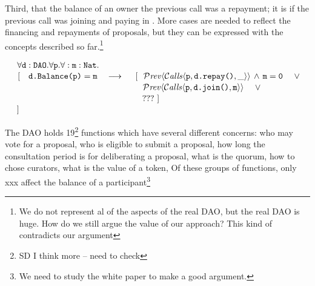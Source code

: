 \noindent
Third, that the balance of an owner  the previous call was
a repayment; it is  if  the previous call was  joining  and paying in . More cases are needed to reflect the financing and repayments of proposals, but they can be expressed with the concepts described so far.\footnote{We do not represent al of the
aspects of the real DAO, but the real DAO is huge.
How do we still argue the value of our approach? This kind of contradicts our argument}

\noindent
$\strut \hspace{0.5cm} \forall {\mbox{\tt{d}}}:{\mbox{\tt{DAO}}}.\forall {\mbox{\tt{p}}}.\forall:{\mbox{\tt{m}}}:{\mbox{\tt{Nat}}}.$\\
$\strut \hspace{0.5cm} [ \ \ \  \prg{d.Balance(p)}=\prg{m} \ \ \  \longrightarrow   
 \ \  \ \ 
  [ \  \ \Prev{\Calls{\prg{p},\prg{d.repay()},\_}}\, \wedge\, \prg{m}=\prg{0} \ \ \ \ \vee $\\
$\strut \hspace{5.7cm}      
\Prev{\Calls{\prg{p},\prg{d.join()},\prg{m}}}  \ \ \ \ \vee   $\\
 $\strut \hspace{5.7cm}  ??? \  ]$ \\
%                         
$\strut \hspace{0.5cm} ] $
  



 

\noindent

The DAO holds 19\footnote{SD I think more -- need to check} functions which have several different concerns:
who may vote   for a proposal, who is eligible to submit a proposal, how long the consultation period is for deliberating a proposal, what is the quorum, how to chose curators, what is the value of a token,   Of these groups of functions, only xxx affect the balance of a participant\footnote{We need to study the white paper to make a good argument.}
 